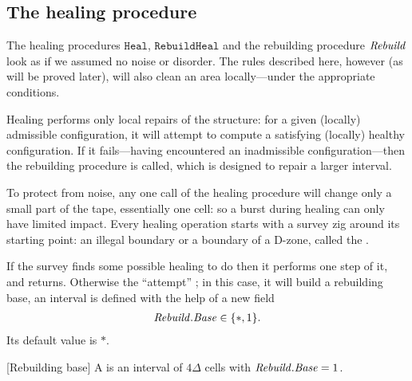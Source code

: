 \documentclass[11pt]{memoir}
\theoremstyle{definition} %
\newcommand{\fld}[1]{\ensuremath{\textit{#1\/}}}
\newcommand{\rul}[1]{\ensuremath{\texttt{#1}}}
\newcommand{\Base}{\fld{Base}}
\newcommand{\Core}{\fld{Core}}
\newcommand{\Rebuild}{\fld{Rebuild}} %
\newcommand{\rHeal}{\rul{Heal}}
\newcommand{\rRebuildHeal}{\rul{RebuildHeal}}
\begin{document}
\subsection{The healing procedure}\label{sec:healing-proc}

The healing procedures \( \rHeal \), \( \rRebuildHeal \)
and the rebuilding procedure \( \Rebuild \) look as if we assumed no noise or disorder.
The rules described here, however (as will be proved later), will also clean an area
locally---under the appropriate conditions.

Healing performs only local repairs of the structure: for a given (locally) admissible configuration,
it will attempt to compute a satisfying (locally) healthy configuration.
If it fails---having encountered an inadmissible configuration---then
the rebuilding procedure is called, which is designed to repair a larger interval.

To protect from noise, any one call of the healing procedure will change only 
a small part of the tape, essentially one cell: so a burst during healing
can only have limited impact.
Every healing operation starts with a survey zig around its starting point:
an illegal boundary or a boundary of a D-zone, called the .

If the survey finds some possible healing to do then it performs one step of it, and returns.
Otherwise the ``attempt'' ; in this case, it will build a rebuilding base,
an interval is defined with the help of a new field
\begin{align*}
   \Rebuild.\Base\in\{*,1\}.
\end{align*}
Its default value is \( * \).

\begin{definition}\label{def:rebuild-base}[Rebuilding base]
  A  is an interval of \( 4\Delta \) cells with \( \Rebuild.\Base=1 \).
\end{definition}

%
\end{document}
